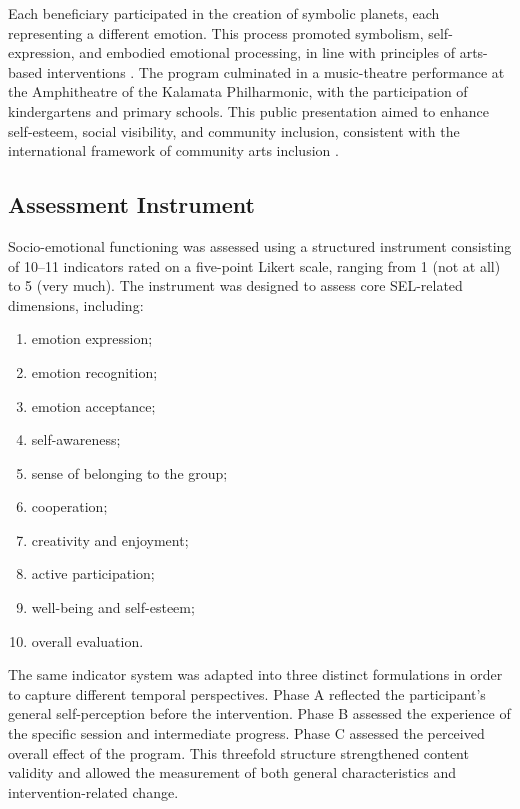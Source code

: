 \documentclass[journal]{IEEEtran}
\begin{document}
Each beneficiary participated in the creation of symbolic planets, each representing a different emotion. This process promoted symbolism, self-expression, and embodied emotional processing, in line with principles of arts-based interventions \cite{malchiodi2020,goldstein2017,hinz2009}. The program culminated in a music-theatre performance at the Amphitheatre of the Kalamata Philharmonic, with the participation of kindergartens and primary schools. This public presentation aimed to enhance self-esteem, social visibility, and community inclusion, consistent with the international framework of community arts inclusion \cite{nicholson2005,white2013}.

\subsection{Assessment Instrument}

Socio-emotional functioning was assessed using a structured instrument consisting of 10--11 indicators rated on a five-point Likert scale, ranging from 1 (not at all) to 5 (very much). The instrument was designed to assess core SEL-related dimensions, including:

\begin{enumerate}
    \item emotion expression;
    \item emotion recognition;
    \item emotion acceptance;
    \item self-awareness;
    \item sense of belonging to the group;
    \item cooperation;
    \item creativity and enjoyment;
    \item active participation;
    \item well-being and self-esteem;
    \item overall evaluation.
\end{enumerate}

The same indicator system was adapted into three distinct formulations in order to capture different temporal perspectives. Phase A reflected the participant's general self-perception before the intervention. Phase B assessed the experience of the specific session and intermediate progress. Phase C assessed the perceived overall effect of the program. This threefold structure strengthened content validity and allowed the measurement of both general characteristics and intervention-related change.
\end{document}
